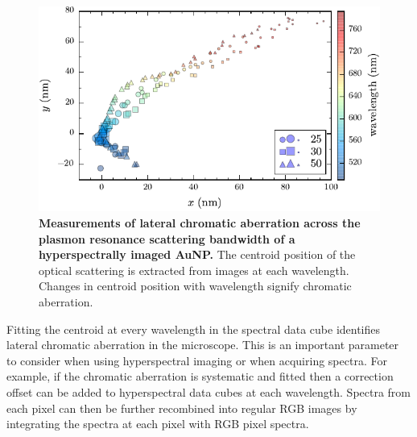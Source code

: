 \documentclass{article}
\begin{document}
\begin{figure}[bt]
\centering
\includegraphics{figures/lateral_chromatic_aberration}
\caption[Measurements of lateral chromatic aberration across the plasmon resonance scattering bandwidth of a hyperspectrally imaged AuNP.]{\textbf{Measurements of lateral chromatic aberration across the plasmon resonance scattering bandwidth of a hyperspectrally imaged AuNP.} The centroid position of the optical scattering is extracted from images at each wavelength. Changes in centroid position with wavelength signify chromatic aberration.}
\label{fig:lateral_chromatic_aberration}
\end{figure}

Fitting the centroid at every wavelength in the spectral data cube identifies lateral chromatic aberration in the microscope. This is an important parameter to consider when using hyperspectral imaging or when acquiring spectra. For example, if the chromatic aberration is systematic and fitted then a correction offset can be added to hyperspectral data cubes at each wavelength. Spectra from each pixel can then be further recombined into regular RGB images by integrating the spectra at each pixel with RGB pixel spectra.
\end{document}
